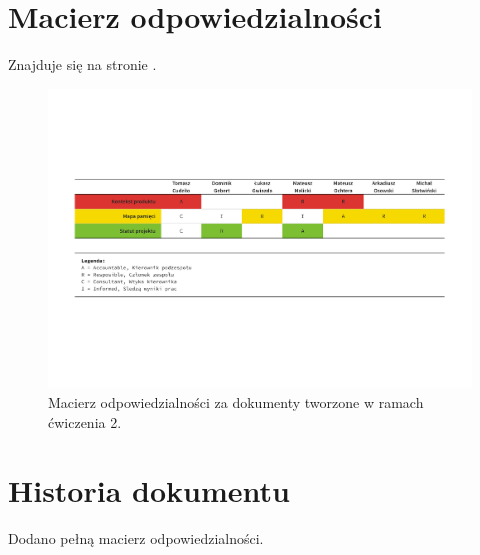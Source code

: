 \documentclass[10pt]{dokument-ppi}
\begin{document}
\Meta
{}
\MakeDokumentMeta


\section{Macierz odpowiedzialności}

Znajduje się na stronie \pageref{fig:macierz}.

\begin{figure}[p]
    \includegraphics[page=1, angle=270, scale=0.75, clip=true]{./figury/macierz-odpowiedzialnosci}
    \caption{Macierz odpowiedzialności za dokumenty tworzone w ramach ćwiczenia 2.}
    \label{fig:macierz}
\end{figure}


\section{Historia dokumentu}
\begin{versions}
        Dodano pełną macierz odpowiedzialności.
\end{versions}
\end{document}
